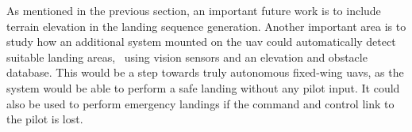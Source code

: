 As mentioned in the previous section, an important future work is to include terrain elevation in the landing sequence generation. Another important area is to 
study how an additional system mounted on the \ac{uav} could automatically detect suitable landing areas, \eg\ using vision sensors and an elevation and obstacle database. 
This would be a step towards truly autonomous fixed-wing \acp{uav}, as the system would be able to perform a safe landing without any pilot input. It could also be used to perform 
emergency landings if the command and control link to the pilot is lost.